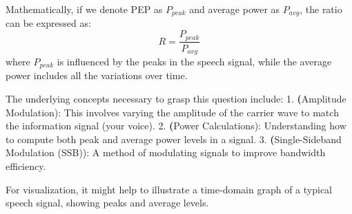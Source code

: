 Mathematically, if we denote PEP as \( P_{peak} \) and average power as \( P_{avg} \), the ratio can be expressed as:
\[
R = \frac{P_{peak}}{P_{avg}}
\]
where \( P_{peak} \) is influenced by the peaks in the speech signal, while the average power includes all the variations over time. 

The underlying concepts necessary to grasp this question include:
1. \textbf(Amplitude Modulation): This involves varying the amplitude of the carrier wave to match the information signal (your voice).
2. \textbf(Power Calculations): Understanding how to compute both peak and average power levels in a signal.
3. \textbf(Single-Sideband Modulation (SSB)): A method of modulating signals to improve bandwidth efficiency.

For visualization, it might help to illustrate a time-domain graph of a typical speech signal, showing peaks and average levels. %